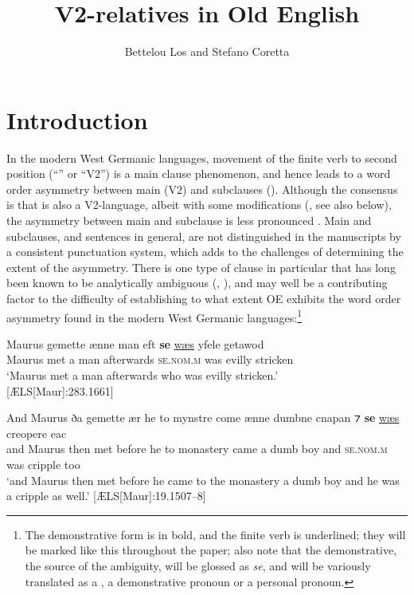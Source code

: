 \documentclass[output=paper,colorlinks,citecolor=brown]{langscibook}
\author{Bettelou Los\affiliation{University of Edinburgh} and Stefano Coretta\affiliation{University of Edinburgh}}
\title{V2-relatives in Old English}
\begin{document}
\maketitle 


\section{Introduction} \label{sec:los:1}

In the modern West Germanic languages, movement of the finite verb to second position (“” or “V2”) is a main clause phenomenon, and hence leads to a word order asymmetry between main (V2) and subclauses (). Although the consensus is that  is also a V2-language, albeit with some modifications (\citealt{vanKemenade1987}, see also  below), the asymmetry between main and subclause is less pronounced \citep{Pintzuk1999}. Main and subclauses, and sentences in general, are not distinguished in the manuscripts by a consistent punctuation system, which adds to the challenges of determining the extent of the asymmetry. There is one type of clause in particular that has long been known to be analytically ambiguous (\citealt[86]{Allen1977}, \citealt[88]{Mitchell1985}), and may well be a contributing factor to the difficulty of establishing to what extent OE exhibits the word order asymmetry found in the modern West Germanic languages:\footnote{The demonstrative form is in bold, and the finite verb is underlined; they will be marked like this throughout the paper; also note that the demonstrative, the source of the ambiguity, will be glossed as \textit{se}, and will be variously translated as a , a demonstrative pronoun or a personal pronoun.}

\ea\label{ex:los:01}
\gll Maurus gemette ænne man eft \textbf{se} \underline{wæs} yfele getawod\\
Maurus met a man afterwards \textsc{se.nom.m} was evilly stricken \\
\glt ‘Maurus met a man afterwards who was evilly stricken.'\\ \hfill [ÆLS[Maur]:283.1661]
\z

\ea\label{ex:los:02}
\gll And Maurus ða gemette ær he to mynstre come ænne dumbne cnapan ⁊ \textbf{se} \underline{wæs} creopere eac\\
and Maurus then met before he to monastery came a dumb boy and \textsc{se.nom.m} was cripple too\\
\glt‘and Maurus then met before he came to the monastery a dumb boy and he was a cripple as well.' \hfill [ÆLS[Maur]:19.1507--8]
\z
\end{document}
